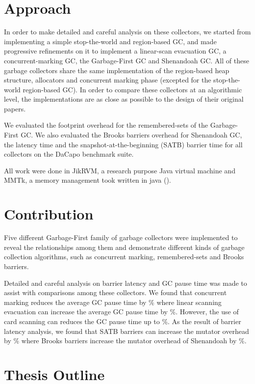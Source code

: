 \section{Approach}

In order to make detailed and careful analysis on these collectors, we started
from implementing a simple stop-the-world and region-based GC, and made
progressive refinements on it to implement a linear-scan evacuation GC,
a concurrent-marking GC, the Garbage-First GC and Shenandoah GC.
All of these garbage collectors share the same implementation of the region-based
heap structure, allocators and concurrent marking phase
(excepted for the stop-the-world region-based GC).
In order to compare these collectors at an algorithmic level, the implementations
are as close as possible to the design of their original papers.

We evaluated the footprint overhead for the remembered-sets of the Garbage-First
GC. We also evaluated the Brooks barriers overhead for Shenandoah GC, the latency
time and the snapshot-at-the-beginning (SATB) barrier time for all collectors
on the DaCapo benchmark suite.

All work were done in JikRVM, a research purpose Java virtual machine and MMTk,
a memory management took written in java (\cite{blackburn2004oil}).

\section{Contribution}

Five different Garbage-First family of garbage collectors were implemented to reveal
the relationships among them and demonstrate different kinds of garbage collection
algorithms, such as concurrent marking, remembered-sets and Brooks barriers.

Detailed and careful analysis on barrier latency and GC pause time was made to
assist with comparisons among these collectors.
We found that concurrent marking reduces the average GC pause time by \%
where linear scanning evacuation can increase the average GC pause time by \%.
However, the use of card scanning can reduces the GC pause time up to \%.
As the result of barrier latency analysis, we found that SATB barriers can
increase the mutator overhead by \% where Brooks barriers
increase the mutator overhead of Shenandoah by \%.

\section{Thesis Outline}

